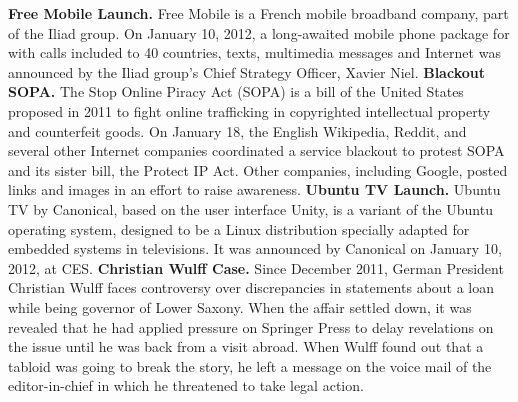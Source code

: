 \textbf{Free Mobile Launch.} Free Mobile is a French mobile broadband company, part of the Iliad group. On January 10, 2012, a long-awaited mobile phone package for  with calls included to 40 countries, texts, multimedia messages and Internet was announced by the Iliad group's Chief Strategy Officer, Xavier Niel.
\newline
\textbf{Blackout SOPA.} The Stop Online Piracy Act (SOPA) is a bill of the United States proposed in 2011 to fight online trafficking in copyrighted intellectual property and counterfeit goods. On January 18, the English Wikipedia, Reddit, and several other Internet companies coordinated a service blackout to protest SOPA and its sister bill, the Protect IP Act. Other companies, including Google, posted links and images in an effort to raise awareness.
\newline
\textbf{Ubuntu TV Launch.} Ubuntu TV by Canonical, based on the user interface Unity, is a variant of the Ubuntu operating system, designed to be a Linux distribution specially adapted for embedded systems in televisions. It was announced by Canonical on January 10, 2012, at CES.
\newline
\textbf{Christian Wulff Case.} Since December 2011, German President Christian Wulff faces controversy over discrepancies in statements about a loan while being governor of Lower Saxony. When the affair settled down, it was revealed that he had applied pressure on Springer Press to delay revelations on the issue until he was back from a visit abroad. When Wulff found out that a tabloid was going to break the story, he left a message on the voice mail of the editor-in-chief in which he threatened to take legal action.

